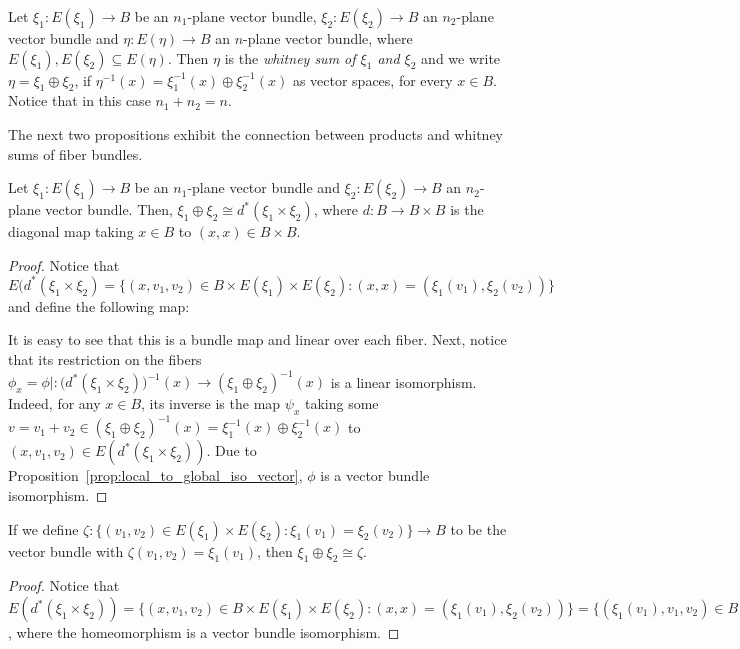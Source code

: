 \begin{definition} Let $\xi_1:E(\xi_1)\to B$ be an $n_1$-plane vector bundle, $\xi_2:E(\xi_2)\to B$ an $n_2$-plane vector bundle and $\eta:E(\eta)\to B$ an $n$-plane vector bundle, where $E(\xi_1),E(\xi_2)\subseteq E(\eta)$. Then $\eta$ is the \emph{whitney sum of $\xi_1$ and $\xi_2$} and we write $\eta=\xi_1\oplus\xi_2$, if $\eta^{-1}(x)=\xi_1^{-1}(x)\oplus\xi_2^{-1}(x)$ as vector spaces, for every $x\in B$. Notice that in this case $n_1+n_2=n$.
\end{definition}

The next two propositions exhibit the connection between products and whitney sums of fiber bundles.
\begin{proposition} Let $\xi_1:E(\xi_1)\to B$ be an $n_1$-plane vector bundle and $\xi_2:E(\xi_2)\to B$ an $n_2$-plane vector bundle. Then, $\xi_1\oplus\xi_2\cong d^*(\xi_1\times\xi_2)$, where $d:B\to B\times B$ is the diagonal map taking $x\in B$ to $(x,x)\in B\times B$.
\end{proposition}
\begin{proof} Notice that $E(d^*(\xi_1\times\xi_2)=\big\{(x,v_1,v_2)\in B\times E(\xi_1)\times E(\xi_2):(x,x)=(\xi_1(v_1),\xi_2(v_2))\big\}$ and define the following map:
\begin{center}
\end{center}
It is easy to see that this is a bundle map and linear over each fiber. Next, notice that its restriction on the fibers $\phi_x=\phi|:\big(d^*(\xi_1\times\xi_2)\big)^{-1}(x)\to(\xi_1\oplus\xi_2)^{-1}(x)$ is a linear isomorphism. Indeed, for any $x\in B$, its inverse is the map $\psi_x$ taking some $v=v_1+v_2\in(\xi_1\oplus\xi_2)^{-1}(x)=\xi_1^{-1}(x)\oplus\xi_2^{-1}(x)$ to $(x,v_1,v_2)\in E(d^*(\xi_1\times\xi_2))$. Due to Proposition~\ref{prop:local_to_global_iso_vector}, $\phi$ is a vector bundle isomorphism.
\end{proof}
\begin{remark} If we define $\zeta:\big\{(v_1,v_2)\in E(\xi_1)\times E(\xi_2):\xi_1(v_1)=\xi_2(v_2)\big\}\to B$ to be the vector bundle with $\zeta(v_1,v_2)=\xi_1(v_1)$, then $\xi_1\oplus\xi_2\cong\zeta$.
\end{remark}
\begin{proof} Notice that
$E(d^*(\xi_1\times\xi_2))=\big\{(x,v_1,v_2)\in B\times E(\xi_1)\times E(\xi_2):(x,x)=(\xi_1(v_1),\xi_2(v_2))\big\}
=\big\{(\xi_1(v_1),v_1,v_2)\in B\times E(\xi_1)\times E(\xi_2):\xi_1(v_1)=\xi_2(v_2)\big\}
\cong\big\{(v_1,v_2)\in E(\xi_1)\times E(\xi_2):\xi_1(v_1)=\xi_2(v_2)\big\}=E(\zeta)$,
where the homeomorphism is a vector bundle isomorphism.
\end{proof}
